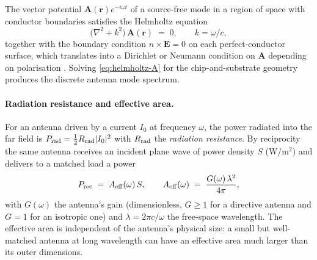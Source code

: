 \begin{statement}
\label{stmt:antenna-modes}
The vector potential $\bm A(\bm r)e^{-i\omega t}$ of a source-free
mode in a region of space with conductor boundaries satisfies the
Helmholtz equation
\begin{equation}
\label{eq:helmholtz-A}
\bigl(\nabla^2 + k^2\bigr)\,\bm A(\bm r) \;=\; 0,
\qquad k=\omega/c,
\end{equation}
together with the boundary condition $\hat n\times\bm E = 0$ on
each perfect-conductor surface, which translates into a Dirichlet
or Neumann condition on $\bm A$ depending on polarisation
\cite{pozar2011}. Solving \cref{eq:helmholtz-A} for the
chip-and-substrate geometry produces the discrete antenna mode
spectrum.
\end{statement}

\paragraph{Radiation resistance and effective area.}
For an antenna driven by a current $I_0$ at frequency $\omega$, the
power radiated into the far field is $P_{\rm rad}=\tfrac12 R_{\rm rad} |I_0|^2$
with $R_{\rm rad}$ the \emph{radiation resistance}. By reciprocity
the same antenna receives an incident plane wave of power
density $S$ (W/m$^2$) and delivers to a matched load a power
\begin{equation}
\label{eq:effective-area}
P_{\rm rec} \;=\; A_{\rm eff}(\omega)\,S,
\qquad
A_{\rm eff}(\omega) \;=\; \frac{G(\omega)\,\lambda^2}{4\pi},
\end{equation}
with $G(\omega)$ the antenna's gain (dimensionless,
$G\geq 1$ for a directive antenna and $G=1$ for an isotropic one)
and $\lambda=2\pi c/\omega$ the free-space wavelength. The
effective area is independent of the antenna's physical size: a
small but well-matched antenna at long wavelength can have an
effective area much larger than its outer dimensions.

